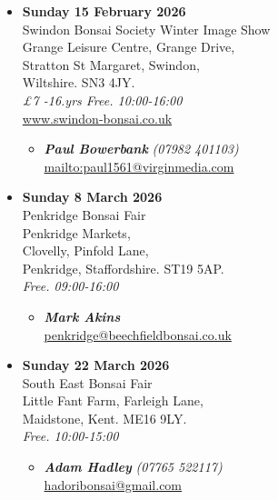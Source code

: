 \begin{itemize}
    \item \textbf{Sunday 15 February 2026}
    \\
    Swindon Bonsai Society Winter Image Show \\
    Grange Leisure Centre, Grange Drive, \\
    Stratton St Margaret, Swindon, \\
    Wiltshire. SN3 4JY.
    \\
    \emph{£7 -16.yrs Free. 10:00-16:00}
    \\
    \href{http://www.swindon-bonsai.co.uk/}{www.swindon-bonsai.co.uk}
    \begin{itemize}
        \item \textbf{\emph{Paul Bowerbank}} \emph{(07982 401103)} \\
        \href{mailto:mailto:paul1561@virginmedia.com}{mailto:paul1561@virginmedia.com} 
    \end{itemize}

    \item \textbf{Sunday 8 March 2026}
    \\
    Penkridge Bonsai Fair \\
    Penkridge Markets, \\
    Clovelly, Pinfold Lane, \\
    Penkridge, Staffordshire. ST19 5AP.
    \\
    \emph{Free. 09:00-16:00}
    \begin{itemize}
        \item \textbf{\emph{Mark Akins}} \\
        \href{mailto:penkridge@beechfieldbonsai.co.uk}{penkridge@beechfieldbonsai.co.uk} 
    \end{itemize}

    \item \textbf{Sunday 22 March 2026}
    \\
    South East Bonsai Fair \\
    Little Fant Farm, Farleigh Lane, \\
    Maidstone, Kent. ME16 9LY.
    \\
    \emph{Free. 10:00-15:00}
    \begin{itemize}
        \item \textbf{\emph{Adam Hadley}} \emph{(07765 522117)} \\
        \href{mailto:hadoribonsai@gmail.com}{hadoribonsai@gmail.com} 
    \end{itemize}


\end{itemize}
